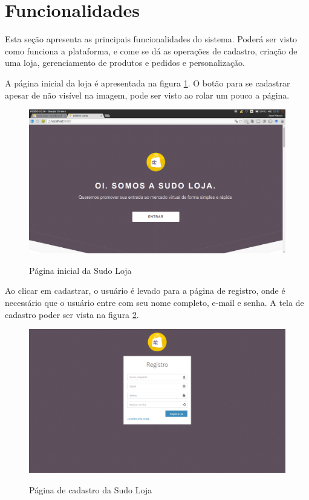 \documentclass[a4paper,12pt]{monografia}
\begin{document}
\section{Funcionalidades} %
\label{sec:funcionalidades-real}

Esta seção apresenta as principais funcionalidades do sistema. Poderá ser visto como funciona a plataforma, e come se dá as operações de cadastro, criação de uma loja, gerenciamento de produtos e pedidos e personalização.

A página inicial da loja é apresentada na figura \ref{fig:inicial}. O botão para se cadastrar apesar de não visível na imagem, pode ser visto ao rolar um pouco a página.

\begin{figure}[H]
\centering
\caption{Página inicial da Sudo Loja}
\centering
\includegraphics[width=15cm]{img/sistema/sudoloja.eps}\\
\label{fig:inicial}
\end{figure}

Ao clicar em cadastrar, o usuário é levado para a página de registro, onde é necessário que o usuário entre com seu nome completo, e-mail e senha. A tela de cadastro poder ser vista na figura \ref{fig:registro}.

\begin{figure}[H]
\centering
\caption{Página de cadastro da Sudo Loja}
\centering
\includegraphics[width=15cm]{img/sistema/registro.png.eps}\\
\label{fig:registro}
\end{figure}
\end{document}
